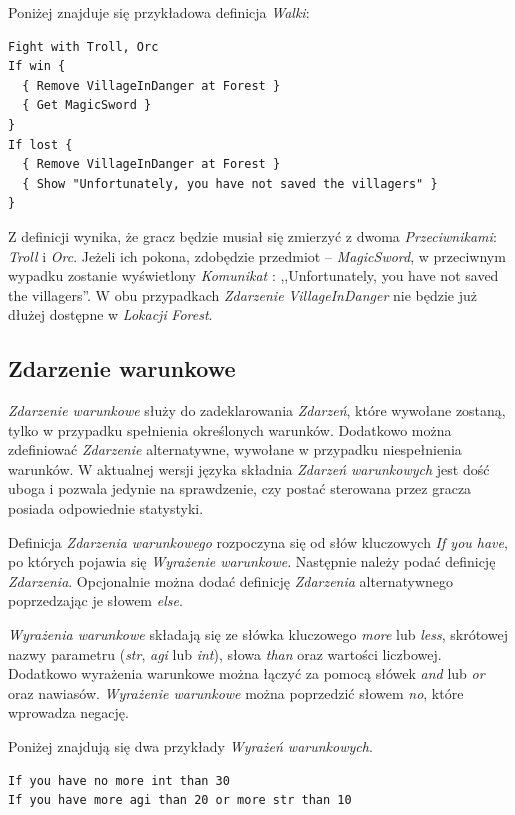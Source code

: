 \documentclass[openright]{xmgr}
\begin{document}
Poniżej znajduje się przykładowa definicja \textit{Walki}:
\begin{verbatim}
Fight with Troll, Orc
If win {
  { Remove VillageInDanger at Forest }
  { Get MagicSword }
}
If lost {
  { Remove VillageInDanger at Forest }
  { Show "Unfortunately, you have not saved the villagers" }
}
\end{verbatim}

Z definicji wynika, że gracz będzie musiał się zmierzyć z dwoma \textit{Przeciwnikami}: \textit{Troll} i \textit{Orc}. Jeżeli ich pokona, zdobędzie przedmiot -- \textit{MagicSword}, w przeciwnym wypadku zostanie wyświetlony \textit{Komunikat} : ,,Unfortunately, you have not saved the villagers''. W obu przypadkach \textit{Zdarzenie} \textit{VillageInDanger} nie będzie już dłużej dostępne w \textit{Lokacji} \textit{Forest}.

\subsection*{Zdarzenie warunkowe}
\textit{Zdarzenie warunkowe} służy do zadeklarowania \textit{Zdarzeń}, które wywołane zostaną, tylko w przypadku spełnienia określonych warunków. Dodatkowo można zdefiniować \textit{Zdarzenie} alternatywne, wywołane w przypadku niespełnienia warunków. W aktualnej wersji języka składnia \textit{Zdarzeń warunkowych} jest dość uboga i pozwala jedynie na sprawdzenie, czy postać sterowana przez gracza posiada odpowiednie statystyki.

Definicja \textit{Zdarzenia warunkowego} rozpoczyna się od słów kluczowych \textit{If you have}, po których pojawia się \textit{Wyrażenie warunkowe}. Następnie należy podać definicję \textit{Zdarzenia}. Opcjonalnie można dodać definicję \textit{Zdarzenia} alternatywnego poprzedzając je słowem \textit{else}.

\textit{Wyrażenia warunkowe} składają się ze słówka kluczowego \textit{more} lub \textit{less}, skrótowej nazwy parametru (\textit{str}, \textit{agi} lub \textit{int}), słowa \textit{than} oraz wartości liczbowej. Dodatkowo wyrażenia warunkowe można łączyć za pomocą słówek \textit{and} lub \textit{or} oraz nawiasów. \textit{Wyrażenie warunkowe} można poprzedzić słowem \textit{no}, które wprowadza negację.

Poniżej znajdują się dwa przykłady \textit{Wyrażeń warunkowych}.
\begin{verbatim}
If you have no more int than 30
If you have more agi than 20 or more str than 10
\end{verbatim}
\end{document}

